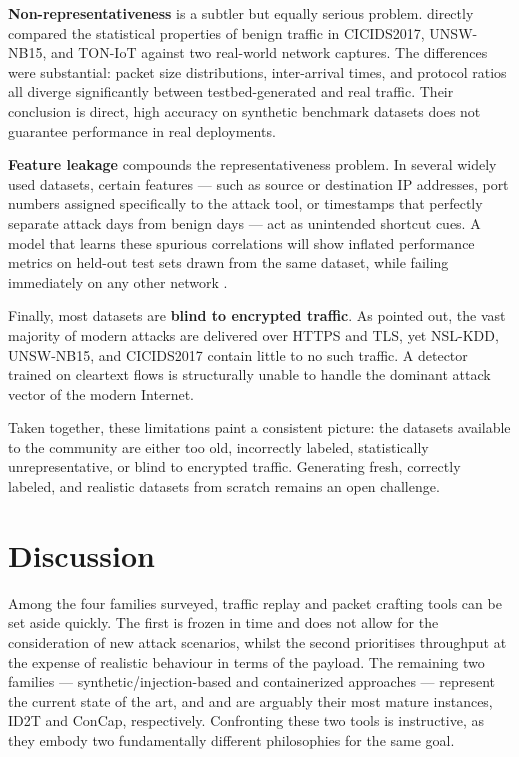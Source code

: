 \documentclass[conference]{IEEEtran}
\begin{document}
\textbf{Non-representativeness} is a subtler but equally serious
problem. \textcite{layeghy2022} directly compared the
statistical properties of benign traffic in CICIDS2017, UNSW-NB15,
and TON-IoT against two real-world network captures. The
differences were substantial: packet size distributions, inter-arrival
times, and protocol ratios all diverge significantly between
testbed-generated and real traffic. Their conclusion is direct,
high accuracy on synthetic benchmark datasets does not guarantee
performance in real deployments.

\textbf{Feature leakage} compounds the representativeness problem.
In several widely used datasets, certain features --- such as
source or destination IP addresses, port numbers assigned
specifically to the attack tool, or timestamps that perfectly
separate attack days from benign days --- act as unintended
shortcut cues. A model that learns these spurious correlations
will show inflated performance metrics on held-out test sets
drawn from the same dataset, while failing immediately on any
other network \cite{flood2024}.

Finally, most datasets are \textbf{blind to encrypted traffic}.
As \textcite{hikari2021} pointed out, the vast majority of modern
attacks are delivered over HTTPS and TLS, yet NSL-KDD, UNSW-NB15,
and CICIDS2017 contain little to no such traffic. A detector
trained on cleartext flows is structurally unable to handle the
dominant attack vector of the modern Internet.

Taken together, these limitations paint a consistent picture:
the datasets available to the community are either too old,
incorrectly labeled, statistically unrepresentative, or blind
to encrypted traffic. Generating fresh, correctly labeled,
and realistic datasets from scratch remains an open challenge.


\section{Discussion}

Among the four families surveyed, traffic replay and packet crafting
tools can be set aside quickly. The first is frozen in time and
does not allow for the consideration of new attack scenarios, whilst the second prioritises
throughput at the expense of realistic behaviour in terms of the payload. 
The remaining two families --- synthetic/injection-based and containerized 
approaches --- represent the current state of the art, and \textcite{id2t2021} and
\textcite{concap2026} are arguably their most mature instances, ID2T
and ConCap, respectively. Confronting these two tools is instructive,
as they embody two fundamentally different philosophies for the same
goal.
\end{document}

